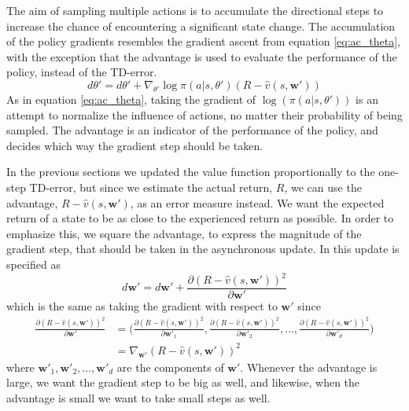\documentclass[11pt]{article}
\begin{document}
The aim of sampling multiple actions is to accumulate the directional steps
to increase the chance of encountering a significant state change.
The accumulation of the policy gradients resembles the gradient ascent from equation
\ref{eq:ac_theta}, with the exception that the advantage is used to evaluate
the performance of the policy, instead of the TD-error.
\begin{equation}
    d\theta' = d\theta' + \nabla_{\theta'} \log \pi(a|s, \theta')(R - \hat{v}(s, \mathbf{w}'))
\end{equation}
As in equation \ref{eq:ac_theta}, taking the gradient of $\log(\pi(a|s, \theta'))$
is an attempt to normalize the influence of actions, no matter their probability
of being sampled.
The advantage is an indicator of the performance of the policy, and decides
which way the gradient step should be taken.

In the previous sections we updated the value function proportionally to the
one-step TD-error, but since we estimate the actual return, $R$,
we can use the advantage, $R - \hat{v}(s, \mathbf{w'})$,
as an error measure instead.
We want the expected return of a state to be as close to the experienced return as possible.
In order to emphasize this, we square the advantage, to express the magnitude of the
gradient step, that should be taken in the asynchronous update.
In \cite{a3c} this update is specified as
\begin{equation}
    d\mathbf{w}' = d\mathbf{w}' + \frac{\partial (R - \hat{v}(s, \mathbf{w'}))^2}{\partial \mathbf{w}'}
\end{equation}
which is the same as taking the gradient with respect to $\mathbf{w}'$ since
\begin{equation*}
    \begin{aligned}
        \frac{\partial (R - \hat{v}(s, \mathbf{w}'))^2}{\partial \mathbf{w}'} & = \bigg(
            \frac{\partial (R - \hat{v}(s, \mathbf{w}'))^2}{\partial \mathbf{w}'_1},
            \frac{\partial (R - \hat{v}(s, \mathbf{w}'))^2}{\partial \mathbf{w}'_2}, \dots,
            \frac{\partial (R - \hat{v}(s, \mathbf{w}'))^2}{\partial \mathbf{w}'_d} \bigg) \\
            & = \nabla_{\mathbf{w}'} (R - \hat{v}(s, \mathbf{w}'))^2
    \end{aligned}
\end{equation*}
where $\mathbf{w}'_1, \mathbf{w}'_2, \dots, \mathbf{w}'_d$ are the components of $\mathbf{w}'$.
Whenever the advantage is large, we want the gradient step to be big as well,
and likewise, when the advantage is small we want to take small steps as well.
\end{document}
